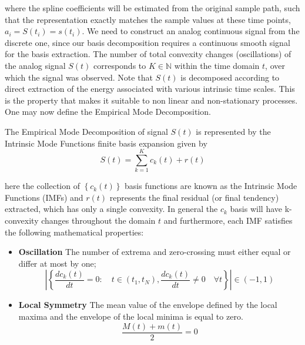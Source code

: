 where the spline coefficients will be estimated from the original sample path, such that the representation exactly matches the sample values at these time points, $a_i = S(t_i) = s(t_i)$. We need to construct an analog continuous signal from the discrete one, since our basis decomposition requires a continuous smooth signal for the basis extraction. The number of total convexity changes (oscillations) of the analog signal $S(t)$ corresponds to $K \in \mathbb{N}$ within the time domain $t$, over which the signal was observed. Note that $S(t)$ is decomposed according to direct extraction of the energy associated with various intrinsic time scales. This is the property that makes it suitable to non linear and non-stationary processes. One may now define the  Empirical Mode Decomposition.


\begin{defn}

The Empirical Mode Decomposition of signal $S(t)$ is represented by the Intrinsic Mode Functions finite basis expansion given by
\begin{equation}
\label{EMD-for}
S(t) = \sum_{k=1}^K c_k \left(t\right) + r \left(t \right)
\end{equation}

here the collection of $\left\{c_k(t)\right\}$ basis functions are known as the Intrinsic Mode Functions (IMFs) and $r \left(t \right)$ represents the final residual (or final tendency) extracted, which has only a single convexity. In general the $c_k$ basis will have k-convexity changes throughout the domain $t$ and furthermore, each IMF satisfies the following mathematical properties:
\begin{itemize}
\item \textbf{Oscillation} The number of extrema and zero-crossing must either equal or differ at most by one;
\begin{equation}
\left| \left\{ \frac{d c_k (t)}{dt} = 0 : \quad t \in \left( t_1, t_N \right), \frac{d c_k (t)}{dt} \neq 0 \quad \forall t    \right\} \right|  \in  \left( -1, 1 \right)
\end{equation}
\item \textbf{Local Symmetry} The mean value of the envelope defined by the local maxima and the envelope of the local minima is equal to zero.  
\begin{equation}
\frac{M(t) + m(t)}{2} = 0
\end{equation}
\end{itemize}
\end{defn}

